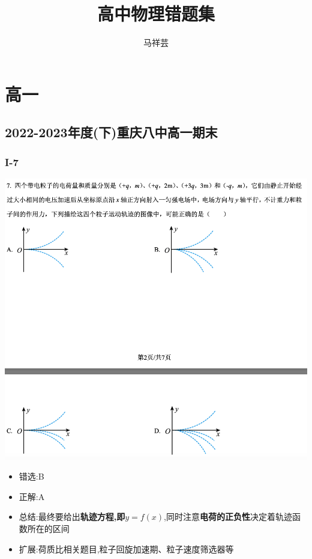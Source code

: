 \documentclass{article}
\title{高中物理错题集}
\author{马祥芸}
\begin{document}
    \maketitle
    \tableofcontents
    \newpage

    \section{高一}  

    \subsection{2022-2023年度(下)重庆八中高一期末}

    \subsubsection{I-7}
    \includegraphics{./pictures/1.1-1.png}

    \begin{itemize}
        \item 错选:\quad B
        \item 正解:\quad A
        \item 总结:最终要给出\textbf{轨迹方程,即$ y = f(x) $},同时注意\textbf{电荷的正负性}决定着轨迹函数所在的区间
        \item 扩展:荷质比相关题目,粒子回旋加速期、粒子速度筛选器等
    \end{itemize}
\end{document}
